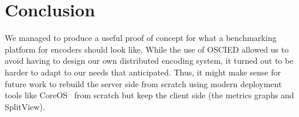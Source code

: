 \documentclass[a4paper,12pt]{article}
\begin{document}
\section{Conclusion}
We managed to produce a useful proof of concept for what a benchmarking platform
for encoders should look like. While the use of OSCIED allowed us to avoid
having to design our own distributed encoding system, it turned out to be harder
to adapt to our needs that anticipated. Thus, it might make sense for future
work to rebuild the server side from scratch using modern deployment tools like
CoreOS~\cite{coreos} from scratch but keep the client side (the metrics graphs and SplitView).
\appendix
{}

\end{document}
